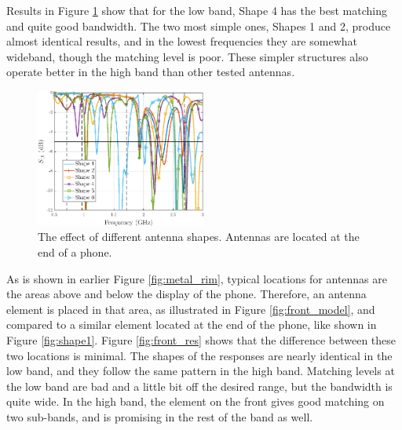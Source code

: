 Results in Figure \ref{fig:shape} show that for the low band, Shape 4 has the best matching and quite good bandwidth. The two most simple ones, Shapes 1 and 2, produce almost identical results, and in the lowest frequencies they are somewhat wideband, though the matching level is poor. These simpler structures also operate better in the high band than other tested antennas.

\begin{figure}[H]
    \centering
    \includegraphics[width=0.5\textwidth]{img/shape.eps}
    \caption{The effect of different antenna shapes. Antennas are located at the end of a phone.}
    \label{fig:shape}
    \vspace{-12pt}
\end{figure}

As is shown in earlier Figure \ref{fig:metal_rim}, typical locations for antennas are the areas above and below the display of the phone. Therefore, an antenna element is placed in that area, as illustrated in Figure \ref{fig:front_model}, and compared to a similar element located at the end of the phone, like shown in Figure \ref{fig:shape1}. Figure \ref{fig:front_res} shows that the difference between these two locations is minimal. The shapes of the responses are nearly identical in the low band, and they follow the same pattern in the high band. Matching levels at the low band are bad and a little bit off the desired range, but the bandwidth is quite wide. In the high band, the element on the front gives good matching on two sub-bands, and is promising in the rest of the band as well.

